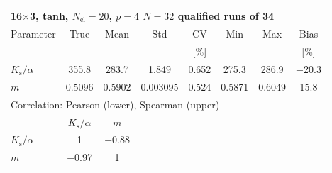 \begin{tabular}{lccccccc}
\toprule
\multicolumn{8}{l}{16$\times$3, tanh, $N_{\mathrm{el}}=20$, $p=4$ \quad $N=32$ qualified runs of 34} \\
\midrule
Parameter & True & Mean & Std & CV & Min & Max & Bias \\
 &  &  &  & [\%] &  &  & [\%] \\
\midrule
  $K_{\mathrm{s}}/\alpha$ & \num{355.8} & \num{283.7} & \num{1.849} & \num{0.652} & \num{275.3} & \num{286.9} & \num[retain-explicit-plus]{-20.3} \\
  $m$ & \num{0.5096} & \num{0.5902} & \num{0.003095} & \num{0.524} & \num{0.5871} & \num{0.6049} & \num[retain-explicit-plus]{+15.8} \\
\midrule
\multicolumn{8}{l}{Correlation: Pearson (lower), Spearman (upper)} \\
 & $K_{\mathrm{s}}/\alpha$ & $m$ &  &  &  &  &  \\
  $K_{\mathrm{s}}/\alpha$ & 1 & \num{-0.88} &  &  &  &  &  \\
  $m$ & \num{-0.97} & 1 &  &  &  &  &  \\
\bottomrule
\end{tabular}
